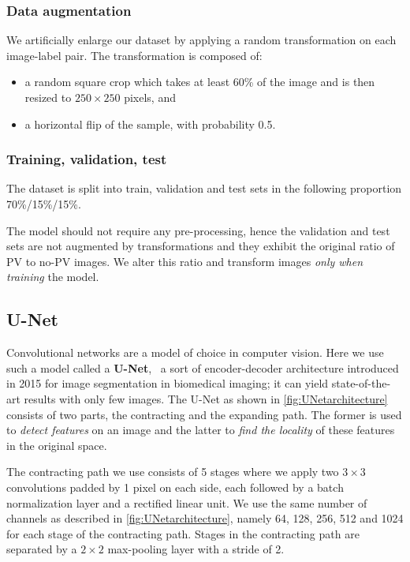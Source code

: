 \documentclass[10pt,conference]{IEEEtran}
\begin{document}
\subsubsection{Data augmentation}
We artificially enlarge our dataset by applying a random transformation on each image-label pair. The transformation is composed of:  
\begin{itemize}
	\item a random square crop which takes at least 60\% of the image and is then resized to $250 \times 250$ pixels, and
	\item a horizontal flip of the sample, with probability 0.5.
\end{itemize}
  
\subsubsection{Training, validation, test}
The dataset is split into train, validation and test sets in the following proportion 70\%/15\%/15\%. 

The model should not require any pre-processing, hence
the validation and test sets are not augmented by transformations and
they exhibit the original ratio of PV to no-PV images.
We alter this ratio and transform images \textit{only when training} the model.

\subsection{U-Net}
Convolutional networks are a model of choice in computer vision. 
Here we use such a model called a \textbf{U-Net},~\cite{ronneberger2015unet} a sort of encoder-decoder architecture
introduced in 2015 for image segmentation in biomedical imaging; it can yield state-of-the-art results with only few images.
The U-Net as shown in \autoref{fig:UNetarchitecture} consists of two parts,
the contracting and the expanding path.
The former is used to \textit{detect features} on an image
and the latter to \textit{find the locality} of these features in the original space.

The contracting path we use consists of 5 stages where we apply two $3 \times 3$ convolutions padded by 1 pixel on each side,
each followed by a batch normalization layer and a rectified linear unit.
We use the same number of channels as described in \autoref{fig:UNetarchitecture}, namely 64, 128, 256, 512 and 1024 for each stage of the contracting path. 
Stages in the contracting path are separated by a $2 \times 2$ max-pooling layer with a stride of 2. 
\end{document}
